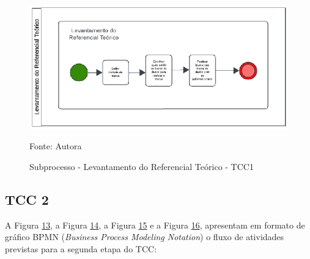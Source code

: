 \begin{figure}[htbp]
    \centering
    \caption{Subprocesso - Levantamento do Referencial Teórico - TCC1}
    \label{fig:subproccessteo}
    
    \vspace{2pt} %
    
    \includegraphics[width=1.0\textwidth]{figuras/subproccessteo.eps}
    
    \vspace{2pt} %
    
    \small Fonte: Autora
\end{figure}

\subsection{TCC 2}\label{subsec:tcc2}

A Figura \hyperref[fig:bpmnTcc2]{13}, a Figura \hyperref[fig:subproccessrec]{14}, a Figura \hyperref[fig:subproccessapi]{15} 
e a Figura \hyperref[fig:subproccessana]{16}, apresentam em formato de gráfico BPMN 
(\textit{Business Process Modeling Notation}) 
o fluxo de atividades previstas para a segunda etapa do TCC:

